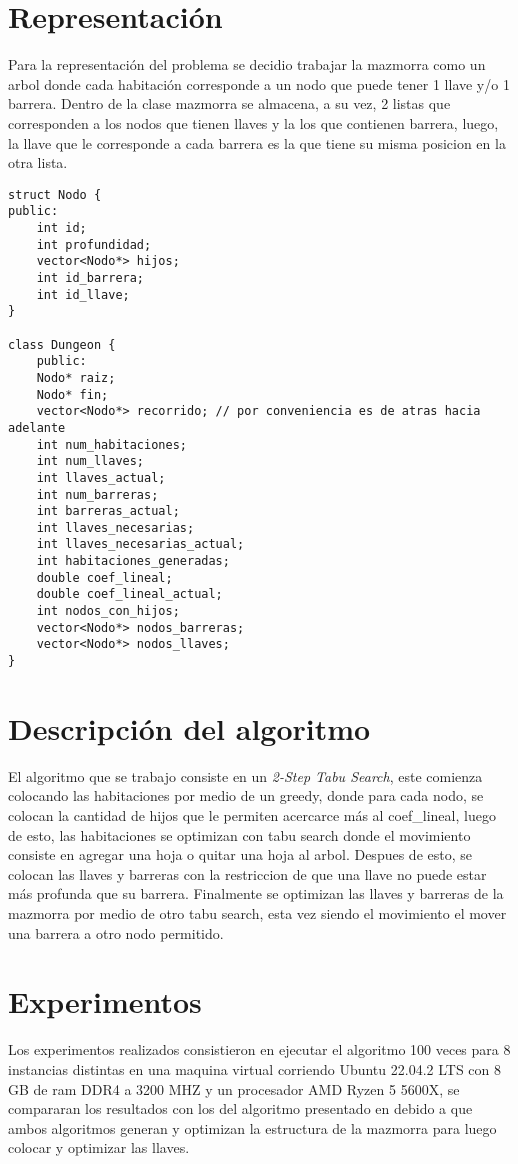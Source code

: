 \documentclass[letter, 10pt]{article}
\begin{document}
\section{Representaci\'on}
Para la representaci\'on del problema se decidio trabajar la mazmorra como un arbol donde cada habitaci\'on corresponde a un nodo que puede tener 1 llave y/o 1 barrera. Dentro de la clase mazmorra se almacena, a su vez, 2 listas que corresponden a los nodos que tienen llaves y la los que contienen barrera, luego, la llave que le corresponde a cada barrera es la que tiene su misma posicion en la otra lista.
\begin{verbatim}
struct Nodo {
public:
    int id;
    int profundidad;
    vector<Nodo*> hijos;
    int id_barrera;
    int id_llave;
}

class Dungeon {
    public:
    Nodo* raiz;
    Nodo* fin;
    vector<Nodo*> recorrido; // por conveniencia es de atras hacia adelante
    int num_habitaciones;
    int num_llaves;
    int llaves_actual;
    int num_barreras;
    int barreras_actual;
    int llaves_necesarias;
    int llaves_necesarias_actual;
    int habitaciones_generadas;
    double coef_lineal;
    double coef_lineal_actual;
    int nodos_con_hijos;
    vector<Nodo*> nodos_barreras;
    vector<Nodo*> nodos_llaves;
}
\end{verbatim}

\section{Descripci\'on del algoritmo}
El algoritmo que se trabajo consiste en un \textit{2-Step Tabu Search}, este comienza colocando las habitaciones por medio de un greedy, donde para cada nodo, se colocan la cantidad de hijos que le permiten acercarce m\'as al coef\_lineal, luego de esto, las habitaciones se optimizan con tabu search donde el movimiento consiste en agregar una hoja o quitar una hoja al arbol. Despues de esto, se colocan las llaves y barreras con la restriccion de que una llave no puede estar m\'as profunda que su barrera. Finalmente se optimizan las llaves y barreras de la mazmorra por medio de otro tabu search, esta vez siendo el movimiento el mover una barrera a otro nodo permitido.

\section{Experimentos}
Los experimentos realizados consistieron en ejecutar el algoritmo 100 veces para 8 instancias distintas en una maquina virtual corriendo Ubuntu 22.04.2 LTS con 8 GB de ram DDR4 a 3200 MHZ y un procesador AMD Ryzen 5 5600X, se compararan los resultados con los del algoritmo presentado en \cite{2stepEA} debido a que ambos algoritmos generan y optimizan la estructura de la mazmorra para luego colocar y optimizar las llaves.
\end{document}
